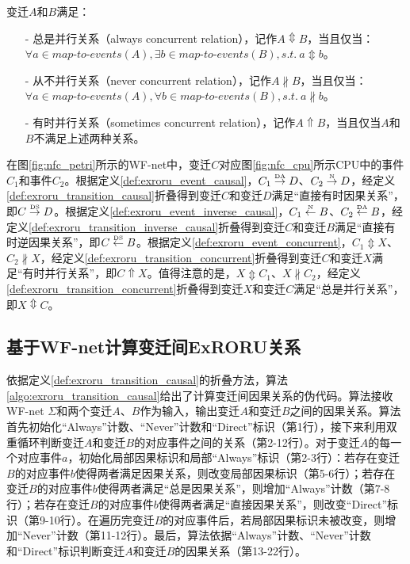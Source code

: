 \begin{definition}[变迁间扩展不确定精炼并行关系]\label{def:exroru_transition_concurrent}
变迁$A$和$B$满足：
  \begin{itemize}
    \item[-] 总是并行关系（always concurrent relation），记作$A\Updownarrow B$，当且仅当：$\forall a\in map$-$to$-$events(A),\exists b\in map$-$to$-$events(B),s.t.~a\Updownarrow b$。
    \item[-] 从不并行关系（never concurrent relation），记作$A\nparallel B$，当且仅当：$\forall a\in map$-$to$-$events(A),\forall b\in map$-$to$-$events(B),s.t.~a\nparallel b$。
    \item[-] 有时并行关系（sometimes concurrent relation），记作$A\Uparrow B$，当且仅当$A$和$B$不满足上述两种关系。
  \end{itemize}
\end{definition}

\begin{example}\label{ex:exroru_transition}
在图\ref{fig:nfc_petri}所示的WF-net中，变迁$C$对应图\ref{fig:nfc_cpu}所示CPU中的事件$C_{1}$和事件$C_{2}$。根据定义\ref{def:exroru_event_causal}，$C_{1}\overset{\text{\tiny{DA}}}{\rightarrow}D$、$C_{2}\overset{\text{\tiny{N}}}{\rightarrow}D$，经定义\ref{def:exroru_transition_causal}折叠得到变迁$C$和变迁$D$满足“直接有时因果关系”，即$C\overset{\text{\tiny{DS}}}{\rightarrow}D$。根据定义\ref{def:exroru_event_inverse_causal}，$C_{1}\overset{\text{\tiny{N}}}{\leftarrow}B$、$C_{2}\overset{\text{\tiny{DA}}}{\leftarrow}B$，经定义\ref{def:exroru_transition_inverse_causal}折叠得到变迁$C$和变迁$B$满足“直接有时逆因果关系”，即$C\overset{\text{\tiny{DS}}}{\leftarrow}B$。根据定义\ref{def:exroru_event_concurrent}，$C_{1}\Updownarrow X$、$C_{2}\nparallel X$，经定义\ref{def:exroru_transition_concurrent}折叠得到变迁$C$和变迁$X$满足“有时并行关系”，即$C\Uparrow X$。值得注意的是，$X\Updownarrow C_{1}$、$X\nparallel C_{2}$，经定义\ref{def:exroru_transition_concurrent}折叠得到变迁$X$和变迁$C$满足“总是并行关系”，即$X\Updownarrow C$。
\end{example}

\subsection{基于WF-net计算变迁间ExRORU关系}\label{subsec:exroru_transition_computation}

依据定义\ref{def:exroru_transition_causal}的折叠方法，算法\ref{algo:exroru_transition_causal}给出了计算变迁间因果关系的伪代码。算法接收WF-net $\Sigma$和两个变迁$A$、$B$作为输入，输出变迁$A$和变迁$B$之间的因果关系。算法首先初始化“Always”计数、“Never”计数和“Direct”标识（第1行），接下来利用双重循环判断变迁$A$和变迁$B$的对应事件之间的关系（第2-12行）。对于变迁$A$的每一个对应事件$a$，初始化局部因果标识和局部“Always”标识（第2-3行）：若存在变迁$B$的对应事件$b$使得两者满足因果关系，则改变局部因果标识（第5-6行）；若存在变迁$B$的对应事件$b$使得两者满足“总是因果关系”，则增加“Always”计数（第7-8行）；若存在变迁$B$的对应事件$b$使得两者满足“直接因果关系”，则改变“Direct”标识（第9-10行）。在遍历完变迁$B$的对应事件后，若局部因果标识未被改变，则增加“Never”计数（第11-12行）。最后，算法依据“Always”计数、“Never”计数和“Direct”标识判断变迁$A$和变迁$B$的因果关系（第13-22行）。

